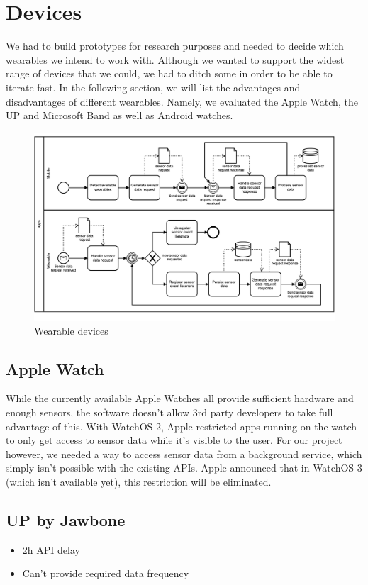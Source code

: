 \section{Devices}
\label{sec:devices}

We had to build prototypes for research purposes and needed to decide which wearables we intend to work with.
Although we wanted to support the widest range of devices that we could, we had to ditch some in order to be able to iterate fast.
In the following section, we will list the advantages and disadvantages of different wearables.
Namely, we evaluated the Apple Watch, the UP and Microsoft Band as well as Android watches.

\begin{figure}[H]
	\includegraphics[width=\linewidth]{diagrams/apps.png}
	\caption[Caption for bpmn]{Wearable devices}
	\label{fig:devices}
\end{figure}

\subsection{Apple Watch}
While the currently available Apple Watches all provide sufficient hardware and enough sensors, the software doesn't allow 3rd party developers to take full advantage of this.
With WatchOS 2, Apple restricted apps running on the watch to only get access to sensor data while it's visible to the user.
For our project however, we needed a way to access sensor data from a background service, which simply isn't possible with the existing APIs.
Apple announced that in WatchOS 3 (which isn't available yet), this restriction will be eliminated. 

\subsection{UP by Jawbone}
\begin{itemize}[noitemsep]
	\item 2h API delay
	\item Can't provide required data frequency
\end{itemize}

